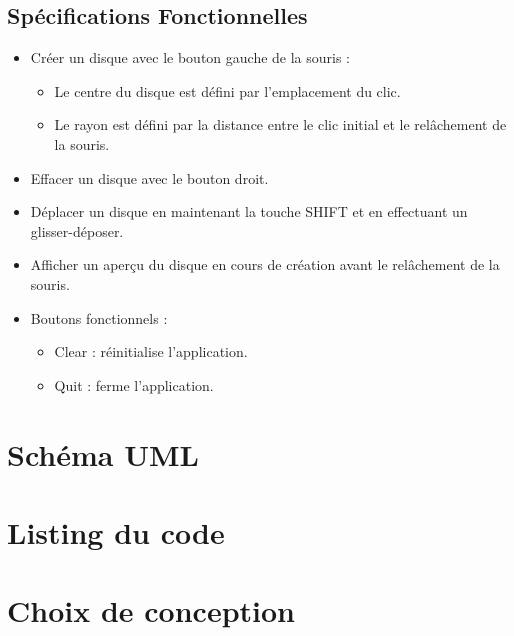 \documentclass[12pt]{report}
\begin{document}
    \subsection*{Spécifications Fonctionnelles}
    \begin{itemize}
        \item Créer un disque avec le bouton gauche de la souris :
        \begin{itemize}
            \item Le centre du disque est défini par l'emplacement du clic.
            \item Le rayon est défini par la distance entre le clic initial et le relâchement de la souris.
        \end{itemize}
        \item Effacer un disque avec le bouton droit.
        \item Déplacer un disque en maintenant la touche SHIFT et en effectuant un glisser-déposer.
        \item Afficher un aperçu du disque en cours de création avant le relâchement de la souris.
        \item Boutons fonctionnels :
        \begin{itemize}
            \item Clear : réinitialise l'application.
            \item Quit : ferme l'application.
        \end{itemize}
    \end{itemize}

    \section*{Schéma UML}

    \section*{Listing du code}

    \section*{Choix de conception}
\end{document}
